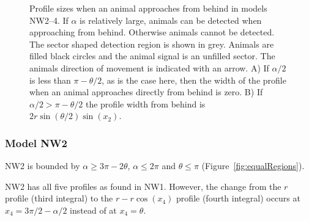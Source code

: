 \begin{figure}[t]
  \centering
{
}
\caption[Profile sizes for an animal approaching from behind: models NW2--4]{
Profile sizes when an animal approaches from behind in models NW2--4.
If $\alpha$ is relatively large, animals can be detected when approaching from behind.
Otherwise animals cannot be detected.
The sector shaped detection region is shown in grey.
Animals are filled black circles and the animal signal is an unfilled sector.
The animals direction of movement is indicated with an arrow.
A) If $\alpha/2$ is less than $\pi - \theta/2$, as is the case here, then the width of the profile when an animal approaches directly from behind is zero.
B) If $\alpha/2 > \pi - \theta/2$ the profile width from behind is $2r\sin\left(\theta/2\right)\sin(x_2)$.
}
\label{fig:NW2--4}
\end{figure}


\subsubsection{Model NW2} \label{NW2}

NW2 is bounded by $\alpha \ge 3\pi - 2\theta$, $\alpha \le 2\pi$ and $\theta\le\pi$ (Figure~\ref{fig:equalRegions}).

NW2 has all five profiles as found in NW1.
However, the change from the $r$ profile (third integral) to the $r - r\cos(x_4)$ profile (fourth integral) occurs at $x_4 = 3\pi/2 - \alpha/2$ instead of at $x_4 = \theta$.

